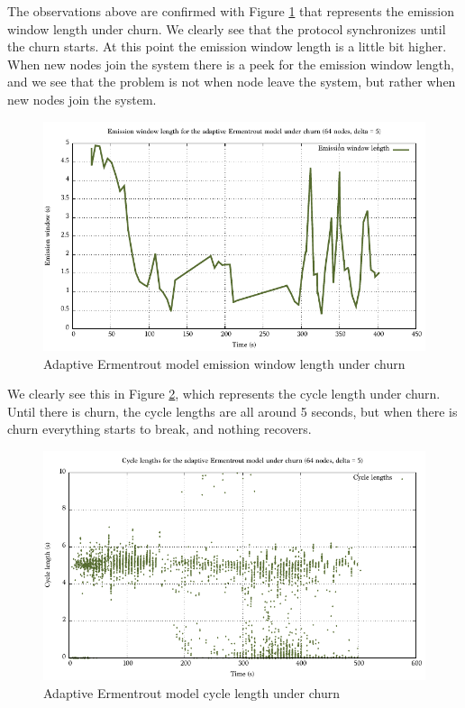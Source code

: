 \documentclass[a4paper, 11pt]{article}
\theoremstyle{plain}
\theoremstyle{definition}
\begin{document}
     The observations above are confirmed with Figure \ref{fig:er-churn-ewl} that represents the emission
     window length under churn. We clearly see that the protocol synchronizes until the churn starts. At this
     point the emission window length is a little bit higher. When new nodes join the system there is a peek
     for the emission window length, and we see that the problem is not when node leave the system, but rather
     when new nodes join the system.

     \begin{figure}[h]
       \centering
       \includegraphics[width=\textwidth]{../Plots/Firefly-er-64nodes-churn-d5-10-ewl.pdf}
       \caption{Adaptive Ermentrout model emission window length under churn}
       \label{fig:er-churn-ewl}
     \end{figure}

     We clearly see this in Figure \ref{fig:er-churn-cl}, which represents the cycle length under churn. Until
     there is churn, the cycle lengths are all around 5 seconds, but when there is churn everything starts to
     break, and nothing recovers. 

     \begin{figure}[h]
       \centering
       \includegraphics[width=\textwidth]{../Plots/Firefly-er-64nodes-churn-d5-10-cl.pdf}
       \caption{Adaptive Ermentrout model cycle length under churn}
       \label{fig:er-churn-cl}
     \end{figure}
\end{document}
